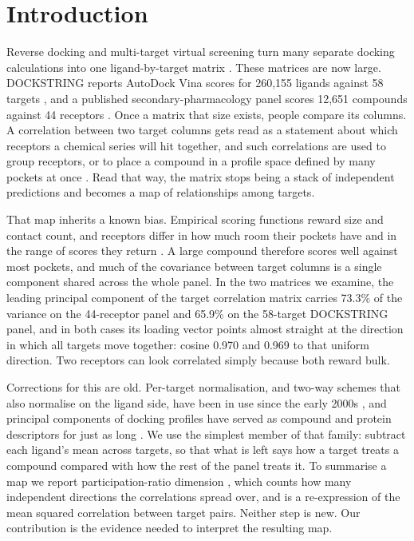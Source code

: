 \section{Introduction}

Reverse docking and multi-target virtual screening turn many separate docking
calculations into one ligand-by-target matrix
\cite{luo2017,lapillo2019,lee2020crds,krause2023}. These matrices are now large.
DOCKSTRING reports AutoDock Vina scores for 260,155 ligands against 58 targets
\cite{vina2010,dockstring2022}, and a published secondary-pharmacology panel
scores 12,651 compounds against 44 receptors \cite{nikitin2025}. Once a matrix
that size exists, people compare its columns. A correlation between two target
columns gets read as a statement about which receptors a chemical series will hit
together, and such correlations are used to group receptors, or to place a
compound in a profile space defined by many pockets at once
\cite{fukunishi2005,fukunishi2006,lee2012profiles,mangione2019cando}. Read that
way, the matrix stops being a stack of independent predictions and becomes a map
of relationships among targets.

That map inherits a known bias. Empirical scoring functions reward size and
contact count, and receptors differ in how much room their pockets have and in
the range of scores they return \cite{pan2003,vigers2004,jacobsson2006}. A large
compound therefore scores well against most pockets, and much of the covariance
between target columns is a single component shared across the whole panel. In
the two matrices we examine, the leading principal component of the target
correlation matrix carries 73.3\% of the variance on the 44-receptor panel and
65.9\% on the 58-target DOCKSTRING panel, and in both cases its loading vector
points almost straight at the direction in which all targets move together:
cosine 0.970 and 0.969 to that uniform direction. Two receptors can look
correlated simply because both reward bulk.

Corrections for this are old. Per-target normalisation, and two-way schemes that
also normalise on the ligand side, have been in use since the early 2000s
\cite{pan2003,carta2007,sepresa2009,casey2009,luo2017}, and principal components
of docking profiles have served as compound and protein descriptors for just as
long \cite{fukunishi2005,fukunishi2006,fukunishi2018}. We use the simplest member
of that family: subtract each ligand's mean across targets, so that what is left
says how a target treats a compound compared with how the rest of the panel
treats it. To summarise a map we report participation-ratio dimension
\cite{mazzucato2016}, which counts how many independent directions the
correlations spread over, and is a re-expression of the mean squared correlation
between target pairs. Neither step is new. Our contribution is the evidence needed
to interpret the resulting map.

